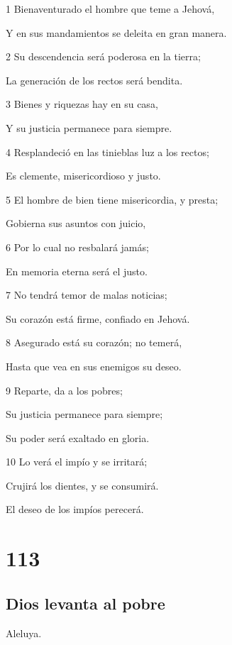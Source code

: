 \par 1 Bienaventurado el hombre que teme a Jehová,
\par Y en sus mandamientos se deleita en gran manera.
\par 2 Su descendencia será poderosa en la tierra;
\par La generación de los rectos será bendita.
\par 3 Bienes y riquezas hay en su casa,
\par Y su justicia permanece para siempre.
\par 4 Resplandeció en las tinieblas luz a los rectos;
\par Es clemente, misericordioso y justo.
\par 5 El hombre de bien tiene misericordia, y presta;
\par Gobierna sus asuntos con juicio,
\par 6 Por lo cual no resbalará jamás;
\par En memoria eterna será el justo.
\par 7 No tendrá temor de malas noticias;
\par Su corazón está firme, confiado en Jehová.
\par 8 Asegurado está su corazón; no temerá,
\par Hasta que vea en sus enemigos su deseo.
\par 9 Reparte, da a los pobres;
\par Su justicia permanece para siempre;
\par Su poder será exaltado en gloria.
\par 10 Lo verá el impío y se irritará;
\par Crujirá los dientes, y se consumirá.
\par El deseo de los impíos perecerá.

\chapter{113}

\section*{Dios levanta al pobre}

\par Aleluya.

